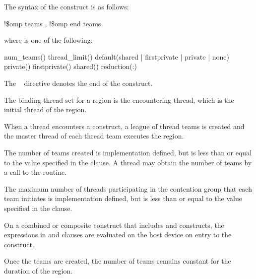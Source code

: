 \begin{fortranspecific}
The syntax of the  construct is as follows:

\begin{boxedcode}
!\$omp teams \plc{[clause[ [},\plc{] clause] ... ]}
!\$omp end teams
\end{boxedcode}

where  is one of the following:

\begin{indentedcodelist}
num\_teams()
thread\_limit()
default(shared \textnormal{|} firstprivate \textnormal{|} private \textnormal{|} none)
private()
firstprivate()
shared()
reduction(:)
\end{indentedcodelist}

The ~ directive denotes the end of the  construct.
\end{fortranspecific}

\begin{samepage}

\binding
The binding thread set for a  region is the encountering thread,
which is the initial thread of the  region.

\descr
When a thread encounters a  construct, a league of thread teams is created and 
the master thread of each thread team executes the  region.

The number of teams created is implementation defined, but is less than or equal to the 
value specified in the  clause.
A thread may obtain the number of teams by a call to the  routine.

\end{samepage}

The maximum number of threads participating in the contention group that each team 
initiates is implementation defined, but is less than or equal to the value specified in the 
 clause.

On a combined or composite construct that includes  and
 constructs, the expressions in  and
 clauses are evaluated on the host device on
entry to the  construct.

Once the teams are created, the number of teams remains constant for the duration of the 
 region.

